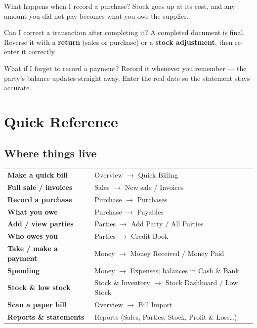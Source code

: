 \documentclass[11pt,a4paper,openany]{report}
\begin{document}
\begin{faqbox}{What happens when I record a purchase?}
Stock goes up at its cost, and any amount you did not pay becomes what you owe the
supplier.
\end{faqbox}
\begin{faqbox}{Can I correct a transaction after completing it?}
A completed document is final. Reverse it with a \textbf{return} (sales or purchase)
or a \textbf{stock adjustment}, then re-enter it correctly.
\end{faqbox}
\begin{faqbox}{What if I forget to record a payment?}
Record it whenever you remember — the party's balance updates straight away. Enter
the real date so the statement stays accurate.
\end{faqbox}

\chapter{Quick Reference}
\section{Where things live}
\begin{center}
\small
\begin{tabularx}{\linewidth}{>{\bfseries\color{navy}}l X}
\toprule
Make a quick bill & Overview $\rightarrow$ Quick Billing \\
Full sale / invoices & Sales $\rightarrow$ New sale / Invoices \\
Record a purchase & Purchase $\rightarrow$ Purchases \\
What you owe & Purchase $\rightarrow$ Payables \\
Add / view parties & Parties $\rightarrow$ Add Party / All Parties \\
Who owes you & Parties $\rightarrow$ Credit Book \\
Take / make a payment & Money $\rightarrow$ Money Received / Money Paid \\
Spending & Money $\rightarrow$ Expenses; balances in Cash \& Bank \\
Stock \& low stock & Stock \& Inventory $\rightarrow$ Stock Dashboard / Low Stock \\
Scan a paper bill & Overview $\rightarrow$ Bill Import \\
Reports \& statements & Reports (Sales, Parties, Stock, Profit \& Loss\ldots) \\
\bottomrule
\end{tabularx}
\end{center}
\end{document}
